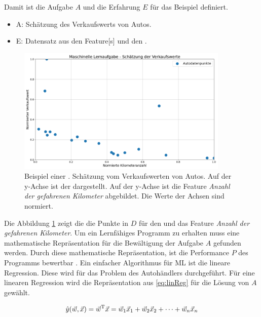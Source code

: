 Damit ist die Aufgabe \(A\) und die Erfahrung \(E\) für das Beispiel definiert. 

\begin{itemize}
    \item A: Schätzung des Verkaufswerts von Autos.
    \item E: Datensatz aus den \gls{Feature}[s] und den .
\end{itemize}

\begin{figure}[htb]
    \centering
    \includegraphics[width=0.9\textwidth]{img/Autohändlerbsp/Schätzung der Verkaufswerte.png}
    \caption[Beispiel einer maschinellen Lernaufgabe.]{Beispiel einer . Schätzung vom Verkaufswerten von Autos. Auf der y-Achse ist der  dargestellt. Auf der y-Achse ist die \gls{Feature} \textit{Anzahl der gefahrenen Kilometer} abgebildet. Die Werte der Achsen sind normiert.}
    \label{fig:BspMLAuto}
\end{figure}


Die Abbildung \ref{fig:BspMLAuto} zeigt die die Punkte in \(D\) für den  und das \gls{Feature} \textit{Anzahl der gefahrenen Kilometer}. Um ein Lernfähiges Programm zu erhalten muss eine mathematische Repräsentation für die Bewältigung der Aufgabe \(A\) gefunden werden. Durch diese mathematische Repräsentation, ist die Performance \(P\) des Programms bewertbar \cite{Mitchell.1997}. Ein einfacher Algorithmus für \gls{ML} ist die lineare Regression. Diese wird für das Problem des Autohändlers durchgeführt. Für eine linearen Regression wird die Repräsentation aus \ref{eq:linReg} für die Lösung von \(A\) gewählt.

\begin{equation}
    \label{eq:linReg}
    \hat{y}(\vec{w}, \vec{x}) =  \vec{w}^\mathrm{T}\vec{x} = \vec{w}_1\vec{x}_1 + \vec{w}_2\vec{x}_2 + \dots + \vec{w}_n\vec{x}_n
\end{equation}

